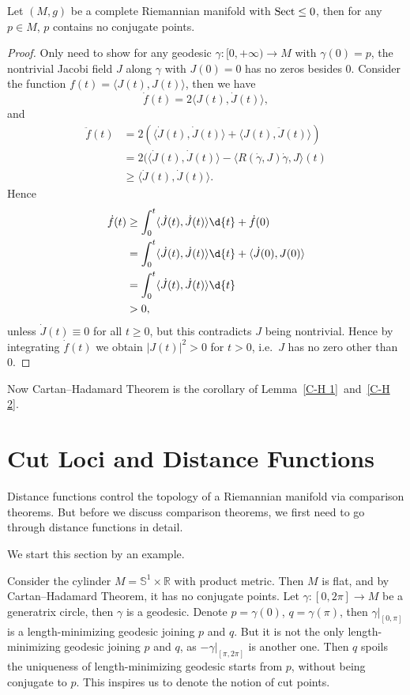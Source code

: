 \begin{lem}\label{C-H 2}
    Let $(M,g)$ be a complete Riemannian manifold with $\operatorname{Sect}\leq 0$, then for any $p\in M$, $p$ contains no conjugate points.
\end{lem}
\begin{proof}
    Only need to show for any geodesic $\gamma:[0,+\infty)\to M$ with $\gamma(0)=p$, the nontrivial Jacobi field $J$ along $\gamma$ with $J(0)=0$ has no zeros besides $0$.
    Consider the function $f(t)=\langle J(t),J(t)\rangle$, then we have
    \[\dot{f}(t)=2\langle J(t),\dot{J}(t)\rangle,\]
    and
    \begin{align*}
        \ddot{f}(t)&=2(\langle\dot{J}(t),\dot{J}(t)\rangle+\langle J(t),\ddot{J}(t)\rangle)\\
        &=2(\langle\dot{J}(t),\dot{J}(t)\rangle-\langle R(\dot\gamma,J)\dot\gamma,J\rangle(t)\\
        &\geq\langle\dot{J}(t),\dot{J}(t)\rangle.
    \end{align*}
    Hence
    \begin{align*}
        \dot{f}(t)&\geq\int_{0}^{t}\langle\dot{J}(t),\dot{J}(t)\rangle\d{t}+\dot{f}(0)\\
        &=\int_{0}^{t}\langle\dot{J}(t),\dot{J}(t)\rangle\d{t}+\langle\dot{J}(0),J(0)\rangle\\
        &=\int_{0}^{t}\langle\dot{J}(t),\dot{J}(t)\rangle\d{t}\\
        &>0,
    \end{align*}
    unless $\dot{J}(t)\equiv 0$ for all $t\geq 0$, but this contradicts $J$ being nontrivial.
    Hence by integrating $\dot{f}(t)$ we obtain $|J(t)|^2>0$ for $t>0$, i.e.\ $J$ has no zero other than $0$.
\end{proof}

Now Cartan--Hadamard Theorem is the corollary of Lemma~\ref{C-H 1}~and~\ref{C-H 2}.


\section{Cut Loci and Distance Functions}

Distance functions control the topology of a Riemannian manifold via comparison theorems.
But before we discuss comparison theorems, we first need to go through distance functions in detail.

We start this section by an example.

\begin{eg}
    Consider the cylinder $M=\mathbb{S}^1\times\mathbb{R}$ with product metric.
    Then $M$ is flat, and by Cartan--Hadamard Theorem, it has no conjugate points.
    Let $\gamma:[0,2\pi]\to M$ be a generatrix circle, then $\gamma$ is a geodesic.
    Denote $p=\gamma(0)$, $q=\gamma(\pi)$, then $\gamma|_{[0,\pi]}$ is a length-minimizing geodesic joining $p$ and $q$.
    But it is not the only length-minimizing geodesic joining $p$ and $q$, as $-\gamma|_{[\pi,2\pi]}$ is another one.
    Then $q$ spoils the uniqueness of length-minimizing geodesic starts from $p$, without being conjugate to $p$.
    This inspires us to denote the notion of cut points.
\end{eg}

